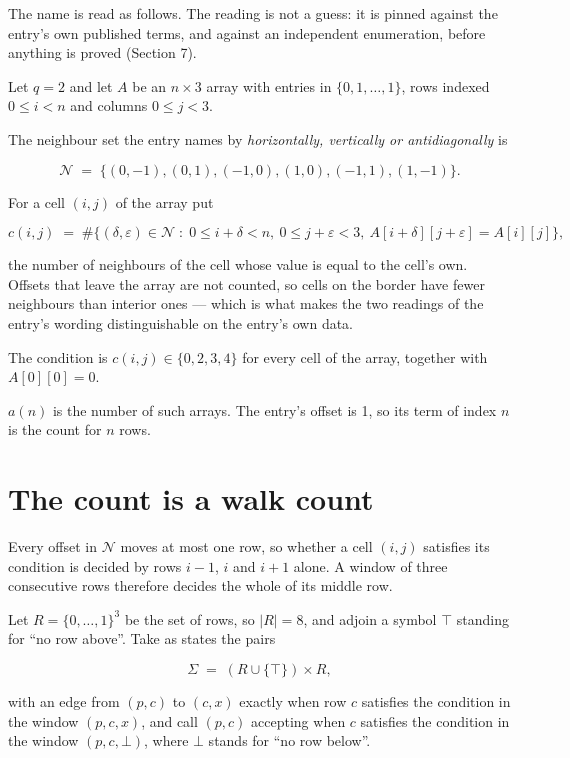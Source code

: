 \documentclass[11pt]{article}
\theoremstyle{definition}
\begin{document}
The name is read as follows. The reading is not a guess: it is pinned against the entry's own published terms, and against an independent enumeration, before anything is proved (Section 7).

Let $q = 2$ and let $A$ be an $n \times 3$ array with entries in $\{0,1,\dots,1\}$, rows indexed $0 \le i < n$ and columns $0 \le j < 3$.

The neighbour set the entry names by {\itshape horizontally, vertically or antidiagonally} is

\[\mathcal{N} \;=\; \{(0,-1), (0,1), (-1,0), (1,0), (-1,1), (1,-1)\}.\]

For a cell $(i,j)$ of the array put

\[c(i,j) \;=\; \#\bigl\{(\delta,\varepsilon)\in\mathcal{N} \;:\; 0\le i+\delta<n,\ 0\le j+\varepsilon<3,\ A[i+\delta][j+\varepsilon] = A[i][j]\bigr\},\]

the number of neighbours of the cell whose value is equal to the cell's own. Offsets that leave the array are not counted, so cells on the border have fewer neighbours than interior ones --- which is what makes the two readings of the entry's wording distinguishable on the entry's own data.

The condition is $c(i,j) \in \{0, 2, 3, 4\}$ for every cell of the array, together with $A[0][0]=0$.

$a(n)$ is the number of such arrays. The entry's offset is 1, so its term of index $n$ is the count for $n$ rows.

\section{The count is a walk count}

Every offset in $\mathcal{N}$ moves at most one row, so whether a cell $(i,j)$ satisfies its condition is decided by rows $i-1$, $i$ and $i+1$ alone. A window of three consecutive rows therefore decides the whole of its middle row.

Let $R = \{0,\dots,1\}^{3}$ be the set of rows, so $|R| = 8$, and adjoin a symbol $\top$ standing for ``no row above''. Take as states the pairs

\[\Sigma \;=\; (R \cup \{\top\}) \times R,\]

with an edge from $(p,c)$ to $(c,x)$ exactly when row $c$ satisfies the condition in the window $(p,c,x)$, and call $(p,c)$ accepting when $c$ satisfies the condition in the window $(p,c,\bot)$, where $\bot$ stands for ``no row below''.
\end{document}
